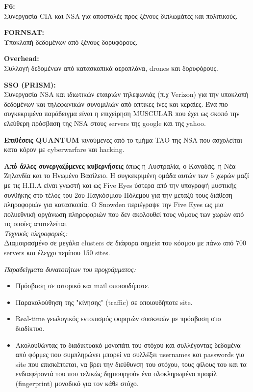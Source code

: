 \documentclass[a4paper, 11pt]{article}
\newcommand{\lt}{\latintext}
\begin{document}
\begin{itemize}
{\textbf {\lt F6:}} \\
Συνεργασία {\lt CIA} και {\lt NSA} για αποστολές προς ξένους διπλωμάτες και πολιτικούς.

{\textbf {\lt FORNSAT:}} \\
Υποκλοπή δεδομένων από ξένους δορυφόρους.

{\textbf {\lt Overhead:}} \\
Συλλογή δεδομένων από κατασκοπικά αεροπλάνα, {\lt drones} και δορυφόρους.

{\textbf {\lt  SSO (PRISM):}} \\
Συνεργασία {\lt NSA} και ιδιωτικών εταιριών τηλεφωνιάς (π.χ {\lt Verizon}) για την υποκλοπή δεδομένων και τηλεφωνικών συνομιλιών από οπτικες ίνες και κεραίες. Ένα πιο συγκεκριμένο παράδειγμα είναι η επιχείρηση {\lt MUSCULAR} που έχει ως σκοπό την ελεύθερη πρόσβαση της {\lt NSA} στους {\lt servers} της {\lt google} και της {\lt yahoo}.

{\textbf {Επιθέσεις {\lt QUANTUM}}} κινούμενες από το τμήμα {\lt TAO} της {\lt NSA} που ασχολείται κατα κόρον με {\lt cyberwarfare} και {\lt hacking}. 

{\textbf {Από άλλες συνεργαζόμενες κυβερνήσεις}} όπως η Αυστραλία, ο Καναδάς, η Νέα Ζηλανδία και το Ηνωμένο Βασίλειο. Η συγκεκριμένη ομάδα αυτών των 5 χωρών μαζί με τις Η.Π.Α είναι γνωστή και ως {\lt Five Eyes} ύστερα από την υπογραφή μυστικής συνθήκης στο τέλος του 2ου Παγκόσμιου Πόλεμου για την μεταξύ τους διάθεση πληροφοριών για κατασκοπία. Ο {\lt Snowden} περιέγραψε την {\lt Five Eyes} ως μια πολυεθνική οργάνωση πληροφοριών που δεν ακολουθεί τους νόμους των χωρών από τις οποίες αποτελείται.
\\

{\textit {Τεχνικές πληροφοριές:}} \\
Διαμοιρασμένο σε μεγάλα {\lt clusters} σε διάφορα σημεία του κόσμου με πάνω από 700 {\lt servers} και έλεγχο περίπου 150 {\lt sites}.

{\textit {Παραδείγματα δυνατοτήτων του προγράμματος:}} 
\begin{itemize}

\item Πρόσβαση σε ιστορικό και {\lt mail} οποιουδήποτε.
\item Παρακολούθηση της "κίνησης" ({\lt traffic}) σε οποιουδήποτε {\lt site}.
\item {\lt Real-time} γεωλογικός εντοπισμός φορητών συσκευών με πρόσβαση στο διαδίκτυο.
\item Ακολουθώντας το διαδικτυακό μονοπάτι του στόχου και συλλέγοντας δεδομένα από φόρμες που συμπληρώνει μπορεί να συλλέξει {\lt usernames} και {\lt passwords} για {\lt site} που επισκέπτεται, να βρει την διεύθυνση του στόχου, τους φίλους του και τα ενδιαφέροντά του που τελικώς δημιουργούν ένα ολοκληρωμένο προφίλ ({\lt fingerprint}) μοναδικό για τον κάθε στόχο.


\end{itemize}
\end{itemize}
\end{document}
